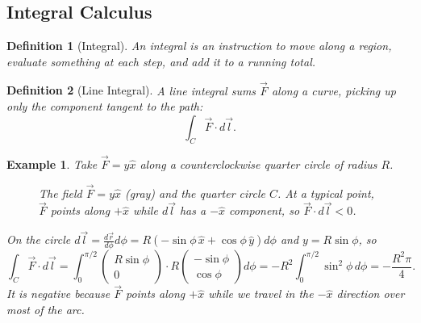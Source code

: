 \documentclass{article}
\newtheorem{definition}{Definition}
\newtheorem*{example}{Example}
\begin{document}
\subsection{Integral Calculus}
\begin{definition}[Integral]
    An integral is an instruction to move along a region, evaluate something at each step, and add it to a running total.
\end{definition}
\begin{definition}[Line Integral]
    A line integral sums $\vec{F}$ along a curve, picking up only the component tangent to the path:
    \[\int_C \vec{F}\cdot d\vec{l}.\]
\end{definition}
\begin{example}
    Take $\vec{F} = y\hat{x}$ along a counterclockwise quarter circle of radius $R$.
    \begin{figure}[H]
        \centering
        \caption{The field $\vec{F} = y\hat{x}$ (gray) and the quarter circle $C$. At a typical point, $\vec{F}$ points along $+\hat{x}$ while $d\vec{l}$ has a $-\hat{x}$ component, so $\vec{F}\cdot d\vec{l} < 0$.}
        \label{fig:quarter-circle-line-integral}
        \end{figure}
    On the circle $d\vec{l} = \frac{d\vec{r}}{d\phi}d\phi = R(-\sin\phi\,\hat{x} + \cos\phi\,\hat{y})d\phi$ and $y = R\sin\phi$, so
    \[\int_C \vec{F}\cdot d\vec{l} = \int_{0}^{\pi/2}\begin{pmatrix} R\sin\phi \\ 0 \end{pmatrix}\cdot R\begin{pmatrix}-\sin\phi\\ \cos\phi\end{pmatrix}d\phi = -R^2\int_0^{\pi/2}\sin^2\phi\,d\phi = -\frac{R^2\pi}{4}.\]
    It is negative because $\vec{F}$ points along $+\hat{x}$ while we travel in the $-\hat{x}$ direction over most of the arc.
\end{example}
\end{document}
